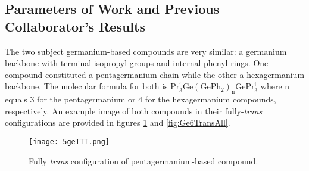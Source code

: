 \subsection{Parameters of Work and Previous Collaborator's Results}

The two subject germanium-based compounds are very similar: a germanium backbone with terminal isopropyl groups and internal phenyl rings. 
One compound constituted a pentagermanium chain while the other a hexagermanium backbone. 
The molecular formula for both is $\mathrm{Pr^{i}_{3}Ge(GePh_{2})_{n}GePr^{i}_{3}}$ where n equals 3 for the pentagermanium or 4 for the hexagermanium compounds, respectively.
An example image of both compounds in their fully-\textit{trans} configurations are provided in figures \ref{fig:Ge5TransAll} and \ref{fig:Ge6TransAll}.

\begin{figure}
	
	\centering
	
	\texttt{[image: 5geTTT.png]}
	
	\caption{Fully \textit{trans} configuration of pentagermanium-based compound.}
	
	\label{fig:Ge5TransAll}
	
\end{figure}

